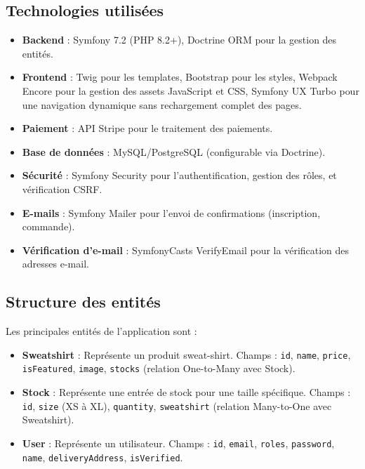 \documentclass[a4paper,11pt]{article}
\begin{document}
\subsection{Technologies utilisées}
\begin{itemize}
    \item \textbf{Backend} : Symfony 7.2 (PHP 8.2+), Doctrine ORM pour la gestion des entités.
    \item \textbf{Frontend} : Twig pour les templates, Bootstrap pour les styles, Webpack Encore pour la gestion des assets JavaScript et CSS, Symfony UX Turbo pour une navigation dynamique sans rechargement complet des pages.
    \item \textbf{Paiement} : API Stripe pour le traitement des paiements.
    \item \textbf{Base de données} : MySQL/PostgreSQL (configurable via Doctrine).
    \item \textbf{Sécurité} : Symfony Security pour l'authentification, gestion des rôles, et vérification CSRF.
    \item \textbf{E-mails} : Symfony Mailer pour l'envoi de confirmations (inscription, commande).
    \item \textbf{Vérification d'e-mail} : SymfonyCasts VerifyEmail pour la vérification des adresses e-mail.
\end{itemize}

\subsection{Structure des entités}
Les principales entités de l'application sont :
\begin{itemize}
    \item \textbf{Sweatshirt} : Représente un produit sweat-shirt. Champs : \texttt{id}, \texttt{name}, \texttt{price}, \texttt{isFeatured}, \texttt{image}, \texttt{stocks} (relation One-to-Many avec Stock).
    \item \textbf{Stock} : Représente une entrée de stock pour une taille spécifique. Champs : \texttt{id}, \texttt{size} (XS à XL), \texttt{quantity}, \texttt{sweatshirt} (relation Many-to-One avec Sweatshirt).
    \item \textbf{User} : Représente un utilisateur. Champs : \texttt{id}, \texttt{email}, \texttt{roles}, \texttt{password}, \texttt{name}, \texttt{deliveryAddress}, \texttt{isVerified}.
\end{itemize}
\end{document}
